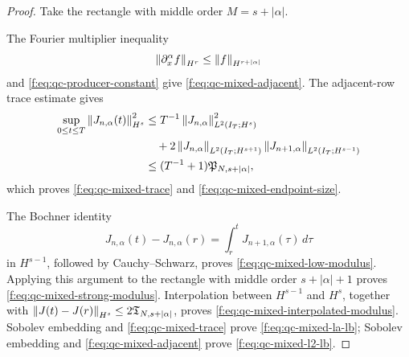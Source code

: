 \begin{proof}
Take the rectangle with middle order \(M=s+|\alpha|\).
\begin{samepage}
The Fourier
multiplier inequality
\[
 \left\lVert \partial_x^\alpha f\right\rVert_{H^r}
 \le \left\lVert f\right\rVert_{H^{r+|\alpha|}}
\]
and \eqref{f:eq:qc-producer-constant} give
\eqref{f:eq:qc-mixed-adjacent}.
The adjacent-row trace estimate gives
\begin{align*}
 \sup_{0\le t\le T}\left\lVert J_{n,\alpha}(t)\right\rVert_{H^s}^2
 &\le T^{-1}\left\lVert J_{n,\alpha}\right\rVert_{L^2(I_T;H^s)}^2\\
 &\quad+2\left\lVert J_{n,\alpha}\right\rVert_{L^2(I_T;H^{s+1})}
          \left\lVert J_{n+1,\alpha}\right\rVert_{L^2(I_T;H^{s-1})}\\
 &\le (T^{-1}+1)\mathfrak P_{N,s+|\alpha|},
\end{align*}
which proves \eqref{f:eq:qc-mixed-trace} and
\eqref{f:eq:qc-mixed-endpoint-size}.
\par
\end{samepage}
The Bochner identity
\[
 J_{n,\alpha}(t)-J_{n,\alpha}(r)
 =\int_r^tJ_{n+1,\alpha}(\tau)\,d\tau
\]
in \(H^{s-1}\), followed by Cauchy--Schwarz, proves
\eqref{f:eq:qc-mixed-low-modulus}.  Applying this argument to the rectangle
with middle order \(s+|\alpha|+1\) proves
\eqref{f:eq:qc-mixed-strong-modulus}.  Interpolation between
\(H^{s-1}\) and \(H^s\), together with
\(\left\lVert J(t)-J(r)\right\rVert_{H^s}\le2\mathfrak T_{N,s+|\alpha|}\), proves
\eqref{f:eq:qc-mixed-interpolated-modulus}.  Sobolev embedding and
\eqref{f:eq:qc-mixed-trace} prove \eqref{f:eq:qc-mixed-la-lb}; Sobolev embedding
and \eqref{f:eq:qc-mixed-adjacent} prove \eqref{f:eq:qc-mixed-l2-lb}.
\end{proof}

